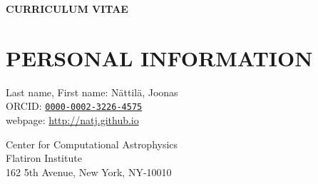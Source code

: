 \documentclass[letterpaper, onecolumn, 11pt]{article}
\begin{document}



\begin{center}
\textbf{CURRICULUM VITAE}
\end{center}


\section*{PERSONAL INFORMATION}
\vspace{-0.3cm}
\begin{minipage}[ht]{0.6\textwidth}
Last name, First name: N\"attil\"a, Joonas\\
ORCID: \href{https://orcid.org/0000-0002-3226-4575}{\nolinkurl{0000-0002-3226-4575}} \\
webpage: \url{http://natj.github.io} \\
\end{minipage}
%
\begin{minipage}[ht]{0.40\textwidth}
    Center for Computational Astrophysics \\
    Flatiron Institute \\
    162 5th Avenue, New York, NY-10010 \\
\end{minipage}


\vspace{-0.5cm}
\end{document}
